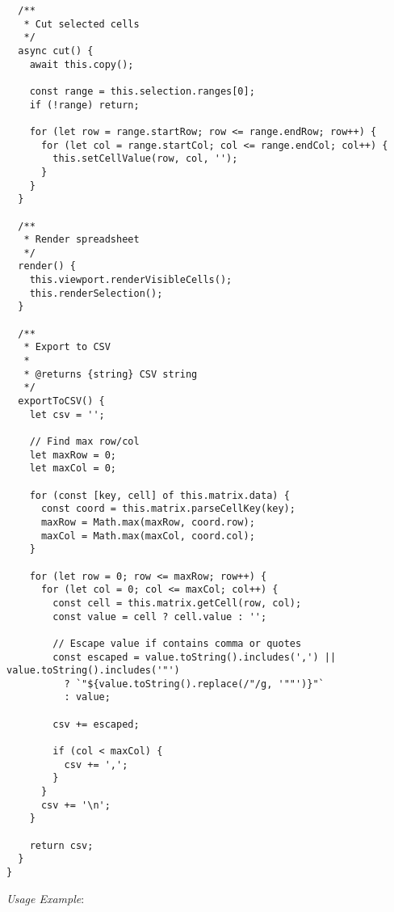 \documentclass[11pt]{article}
\begin{document}
\begin{verbatim}
  /**
   * Cut selected cells
   */
  async cut() {
    await this.copy();
    
    const range = this.selection.ranges[0];
    if (!range) return;
    
    for (let row = range.startRow; row <= range.endRow; row++) {
      for (let col = range.startCol; col <= range.endCol; col++) {
        this.setCellValue(row, col, '');
      }
    }
  }
  
  /**
   * Render spreadsheet
   */
  render() {
    this.viewport.renderVisibleCells();
    this.renderSelection();
  }
  
  /**
   * Export to CSV
   * 
   * @returns {string} CSV string
   */
  exportToCSV() {
    let csv = '';
    
    // Find max row/col
    let maxRow = 0;
    let maxCol = 0;
    
    for (const [key, cell] of this.matrix.data) {
      const coord = this.matrix.parseCellKey(key);
      maxRow = Math.max(maxRow, coord.row);
      maxCol = Math.max(maxCol, coord.col);
    }
    
    for (let row = 0; row <= maxRow; row++) {
      for (let col = 0; col <= maxCol; col++) {
        const cell = this.matrix.getCell(row, col);
        const value = cell ? cell.value : '';
        
        // Escape value if contains comma or quotes
        const escaped = value.toString().includes(',') || value.toString().includes('"')
          ? `"${value.toString().replace(/"/g, '""')}"`
          : value;
        
        csv += escaped;
        
        if (col < maxCol) {
          csv += ',';
        }
      }
      csv += '\n';
    }
    
    return csv;
  }
}
\end{verbatim}

\emph{Usage Example}:
\end{document}
